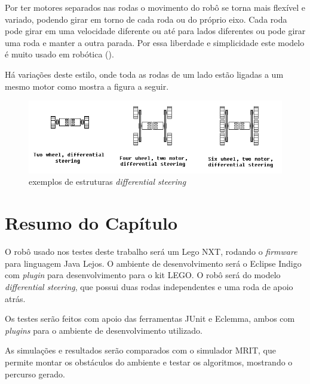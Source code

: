Por ter motores separados nas rodas o movimento do robô se torna mais flexível e variado, podendo girar em torno de cada roda ou do próprio eixo. Cada roda pode girar em uma velocidade diferente ou até para lados diferentes ou pode girar uma roda e manter a outra parada. Por essa liberdade e simplicidade este modelo é muito usado em robótica (\cite{Mataric2007}).

Há variações deste estilo, onde toda as rodas de um lado estão ligadas a um mesmo motor como mostra a figura a seguir.

\begin{figure}[h]
	\centering
	\label{fig18}
		\includegraphics[keepaspectratio=true,scale=0.7]{figuras/3differentialSteering.png}
	\caption{exemplos de estruturas \textit{differential steering} \cite{IMG_DIFFERENTIAL_STEERING_SITE}}
\end{figure}

\section{Resumo do Capítulo}

O robô usado nos testes deste trabalho será um Lego NXT, rodando o \textit{firmware} para linguagem Java Lejos. O ambiente de desenvolvimento será o Eclipse Indigo com \textit{plugin} para desenvolvimento para o kit LEGO. O robô será do modelo \textit{differential steering}, que possui duas rodas independentes e uma roda de apoio atrás.

Os testes serão feitos com apoio das ferramentas JUnit e Eclemma, ambos com \textit{plugins} para o ambiente de desenvolvimento utilizado.

As simulações e resultados serão comparados com o simulador MRIT, que permite montar os obstáculos do ambiente e testar os algoritmos, mostrando o percurso gerado.